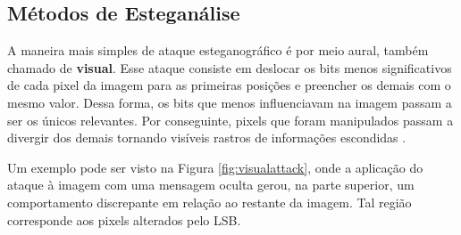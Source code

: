 \subsection{Métodos de Esteganálise}
\label{subsec:esteganalise-alg}

A maneira mais simples de ataque esteganográfico é por meio aural, também chamado de \textbf{visual}. Esse ataque consiste em deslocar os bits menos significativos de cada pixel da imagem para as primeiras posições e preencher os demais com o mesmo valor. Dessa forma, os bits que menos influenciavam na imagem passam a ser os únicos relevantes. Por conseguinte, pixels que foram manipulados passam a divergir dos demais tornando visíveis rastros de informações escondidas \cite{wayner2009disappearing}. 

Um exemplo pode ser visto na Figura \ref{fig:visualattack}, onde a aplicação do ataque à imagem com uma mensagem oculta gerou, na parte superior, um comportamento discrepante em relação ao restante da imagem. Tal região corresponde aos pixels alterados pelo LSB.
